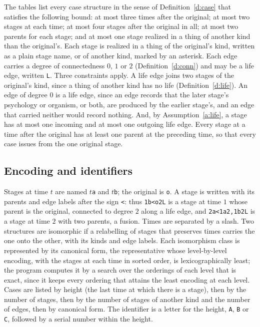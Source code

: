 \documentclass{situationist-preprint}
\begin{document}
The tables list every case structure in the sense of Definition~\ref{d:case} that satisfies the following bound: at most three times after the original; at most two stages at each time; at most four stages after the original in all; at most two parents for each stage; and at most one stage realized in a thing of another kind than the original's. Each stage is realized in a thing of the original's kind, written as a plain stage name, or of another kind, marked by an asterisk. Each edge carries a degree of connectedness $0$, $1$ or $2$ (Definition~\ref{d:conn}) and may be a life edge, written \texttt{L}. Three constraints apply. A life edge joins two stages of the original's kind, since a thing of another kind has no life (Definition~\ref{d:life}). An edge of degree $0$ is a life edge, since an edge records that the later stage's psychology or organism, or both, are produced by the earlier stage's, and an edge that carried neither would record nothing. And, by Assumption~\ref{a:life}, a stage has at most one incoming and at most one outgoing life edge. Every stage at a time after the original has at least one parent at the preceding time, so that every case issues from the one original stage.

\subsection*{Encoding and identifiers}

Stages at time $t$ are named \texttt{$t$a} and \texttt{$t$b}; the original is \texttt{o}. A stage is written with its parents and edge labels after the sign \texttt{<}: thus \texttt{1b<o2L} is a stage at time $1$ whose parent is the original, connected to degree $2$ along a life edge, and \texttt{2a<1a2,1b2L} is a stage at time $2$ with two parents, a fusion. Times are separated by a slash. Two structures are isomorphic if a relabelling of stages that preserves times carries the one onto the other, with its kinds and edge labels. Each isomorphism class is represented by its canonical form, the representative whose level-by-level encoding, with the stages at each time in sorted order, is lexicographically least; the program computes it by a search over the orderings of each level that is exact, since it keeps every ordering that attains the least encoding at each level. Cases are listed by height (the last time at which there is a stage), then by the number of stages, then by the number of stages of another kind and the number of edges, then by canonical form. The identifier is a letter for the height, \texttt{A}, \texttt{B} or \texttt{C}, followed by a serial number within the height.
\end{document}
